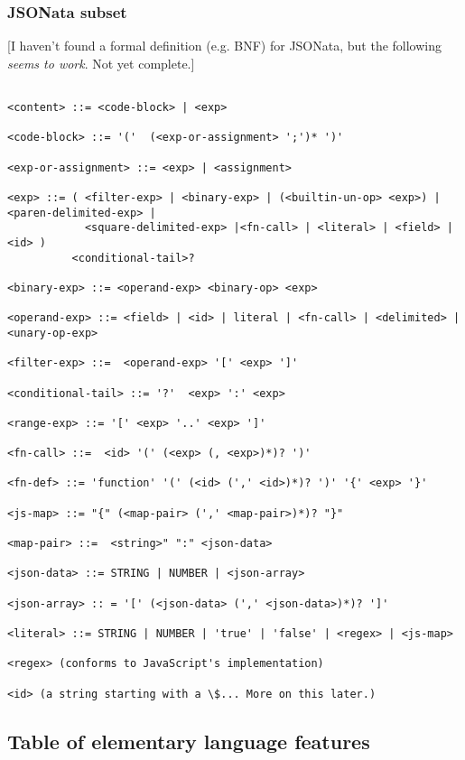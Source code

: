 \documentclass[9pt,letterpaper]{article}
\begin{document}
\subsubsection{JSONata subset}
[I haven't found a formal definition (e.g. BNF) for JSONata, but the following \textit{seems to work}. Not yet complete.]

\begin{Verbatim}[fontsize=\footnotesize]

<content> ::= <code-block> | <exp>

<code-block> ::= '('  (<exp-or-assignment> ';')* ')'

<exp-or-assignment> ::= <exp> | <assignment>

<exp> ::= ( <filter-exp> | <binary-exp> | (<builtin-un-op> <exp>) | <paren-delimited-exp> |
            <square-delimited-exp> |<fn-call> | <literal> | <field> | <id> )
          <conditional-tail>?

<binary-exp> ::= <operand-exp> <binary-op> <exp>

<operand-exp> ::= <field> | <id> | literal | <fn-call> | <delimited> | <unary-op-exp>

<filter-exp> ::=  <operand-exp> '[' <exp> ']'

<conditional-tail> ::= '?'  <exp> ':' <exp>

<range-exp> ::= '[' <exp> '..' <exp> ']'

<fn-call> ::=  <id> '(' (<exp> (, <exp>)*)? ')'

<fn-def> ::= 'function' '(' (<id> (',' <id>)*)? ')' '{' <exp> '}'

<js-map> ::= "{" (<map-pair> (',' <map-pair>)*)? "}"

<map-pair> ::=  <string>" ":" <json-data>

<json-data> ::= STRING | NUMBER | <json-array>

<json-array> :: = '[' (<json-data> (',' <json-data>)*)? ']'

<literal> ::= STRING | NUMBER | 'true' | 'false' | <regex> | <js-map>

<regex> (conforms to JavaScript's implementation)

<id> (a string starting with a \$... More on this later.)

\end{Verbatim}

\subsection{Table of elementary language features}
\end{document}
